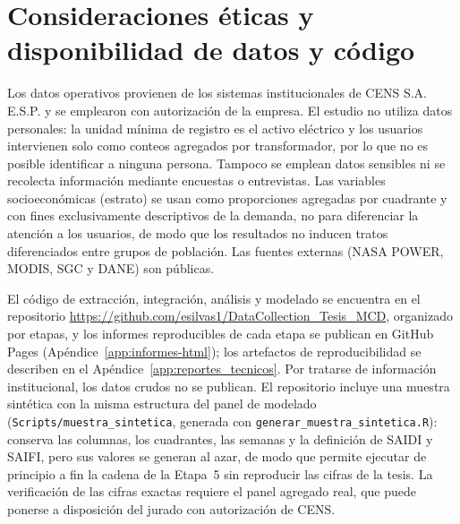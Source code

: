 \section{Consideraciones éticas y disponibilidad de datos y código}
\label{sec:etica_datos}

Los datos operativos provienen de los sistemas institucionales de CENS S.A. E.S.P. y se emplearon con autorización de la empresa. El estudio no utiliza datos personales: la unidad mínima de registro es el activo eléctrico y los usuarios intervienen solo como conteos agregados por transformador, por lo que no es posible identificar a ninguna persona. Tampoco se emplean datos sensibles ni se recolecta información mediante encuestas o entrevistas. Las variables socioeconómicas (estrato) se usan como proporciones agregadas por cuadrante y con fines exclusivamente descriptivos de la demanda, no para diferenciar la atención a los usuarios, de modo que los resultados no inducen tratos diferenciados entre grupos de población. Las fuentes externas (NASA POWER, MODIS, SGC y DANE) son públicas.

El código de extracción, integración, análisis y modelado se encuentra en el repositorio \url{https://github.com/esilvas1/DataCollection_Tesis_MCD}, organizado por etapas, y los informes reproducibles de cada etapa se publican en GitHub Pages (Apéndice~\ref{app:informes-html}); los artefactos de reproducibilidad se describen en el Apéndice~\ref{app:reportes_tecnicos}. Por tratarse de información institucional, los datos crudos no se publican. El repositorio incluye una muestra sintética con la misma estructura del panel de modelado (\texttt{Scripts/muestra\_sintetica}, generada con \texttt{generar\_muestra\_sintetica.R}): conserva las columnas, los cuadrantes, las semanas y la definición de SAIDI y SAIFI, pero sus valores se generan al azar, de modo que permite ejecutar de principio a fin la cadena de la Etapa~5 sin reproducir las cifras de la tesis. La verificación de las cifras exactas requiere el panel agregado real, que puede ponerse a disposición del jurado con autorización de CENS.
